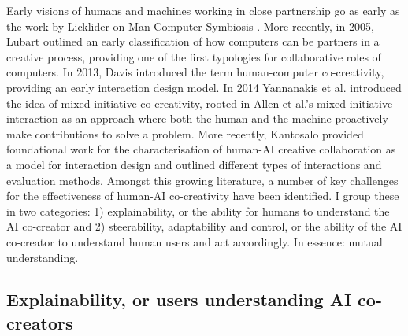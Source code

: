 Early visions of humans and machines working in close partnership go as early as the work by Licklider on Man-Computer Symbiosis \cite{Licklider1960-md}. More recently, in 2005, Lubart \cite{Lubart2005-zi} outlined an early classification of how computers can be partners in a creative process, providing one of the first typologies for collaborative roles of computers. In 2013, Davis \cite{Davis2013-jy} introduced the term human-computer co-creativity, providing an early interaction design model. In 2014 Yannanakis et al. \cite{Yannakakis2014-zs} introduced the idea of mixed-initiative co-creativity, rooted in Allen et al.'s \cite{Allen1999-sr} mixed-initiative interaction as an approach where both the human and the machine proactively make contributions to solve a problem. More recently, Kantosalo \cite{Kantosalo2015-pk} provided foundational work for the characterisation of human-AI creative collaboration as a model for interaction design and outlined different types of interactions and evaluation methods. Amongst this growing literature, a number of key challenges for the effectiveness of human-AI co-creativity have been identified. I group these in two categories: 1) explainability, or the ability for humans to understand the AI co-creator and 2) steerability, adaptability and control, or the ability of the AI co-creator to understand human users and act accordingly. In essence: mutual understanding. 

\subsection{Explainability, or users understanding AI co-creators}

